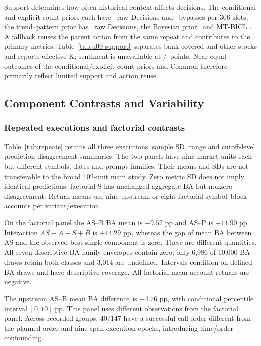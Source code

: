 Support determines how often historical context affects decisions. The conditional and explicit-count priors each have \UnifiedCTwoRaw\ raw Decisions and \UnifiedCTwoBypass\ bypasses per 306 slots; the trend--pattern prior has \UnifiedAPoolRaw\ raw Decisions, the Bayesian prior \UnifiedVOneRaw\ and MT-BICL \UnifiedMTRaw. A fallback reuses the parent action from the same repeat and contributes to the primary metrics. Table~\ref{tab:u09-support} separates bank-covered and other stocks and reports effective K; sentiment is unavailable at \UnifiedMissingSentiment/\UnifiedPoints\ points. Near-equal outcomes of the conditional/explicit-count priors and Common therefore primarily reflect limited support and action reuse.

\subsection{Component Contrasts and Variability}
\subsubsection{Repeated executions and factorial contrasts}
Table~\ref{tab:repeats} retains all three executions, sample SD, range and cutoff-level prediction disagreement summaries. The two panels have nine market units each but different symbols, dates and prompt families. Their means and SDs are not transferable to the broad 102-unit main study. Zero metric SD does not imply identical predictions: factorial S has unchanged aggregate BA but nonzero disagreement. Return means use nine upstream or eight factorial symbol--block accounts per variant/execution.

On the factorial panel the AS--B BA mean is $-9.52$ pp and AS--P is $-11.90$ pp. Interaction $AS-A-S+B$ is $+14.29$ pp, whereas the gap of mean BA between AS and the observed best single component is zero. These are different quantities. All seven descriptive BA family envelopes contain zero; only 6,986 of 10,000 BA draws retain both classes and 3,014 are undefined. Intervals condition on defined BA draws and have descriptive coverage. All factorial mean account returns are negative.

The upstream AS--B mean BA difference is $+4.76$ pp, with conditional percentile interval $[0,10]$ pp. This panel uses different observations from the factorial panel. Across recorded groups, 40/147 have a successful-call order different from the planned order and nine span execution epochs, introducing time/order confounding.


